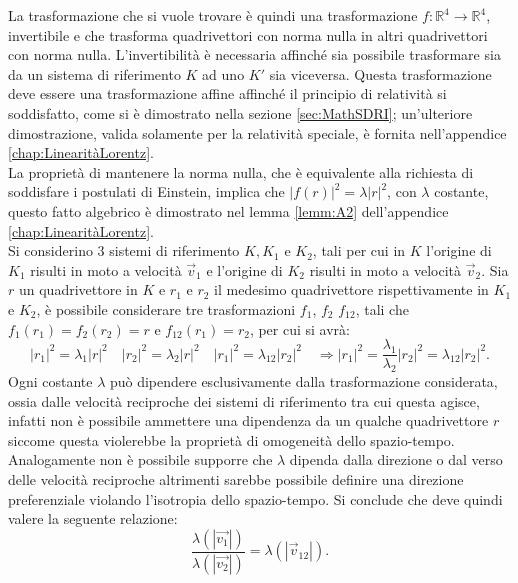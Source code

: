 La trasformazione che si vuole trovare è quindi una trasformazione $f:\mathbb{R}^4\rightarrow\mathbb{R}^4$, invertibile e che trasforma quadrivettori con norma nulla in altri quadrivettori con norma nulla. L'invertibilità è necessaria affinché sia possibile trasformare sia da un sistema di riferimento $K$ ad uno $K'$ sia viceversa. Questa trasformazione deve essere una trasformazione affine affinché il principio di relatività si soddisfatto, come si è dimostrato nella sezione \ref{sec:MathSDRI}; un'ulteriore dimostrazione, valida solamente per la relatività speciale, è fornita nell'appendice \ref{chap:LinearitàLorentz}.\\
La proprietà di mantenere la norma nulla, che è equivalente alla richiesta di soddisfare i postulati di Einstein, implica che  $|f(r)|^2=\lambda |r|^2$, con $\lambda$ costante, questo fatto algebrico è dimostrato nel lemma \ref{lemm:A2} dell'appendice \ref{chap:LinearitàLorentz}.\\ Si considerino $3$ sistemi di riferimento $ K, K_1$ e $K_2$, tali per cui in $K$ l'origine di $K_1$ risulti in moto a velocità $\vec{v}_1$ e l'origine di $K_2$ risulti in moto a velocità $\vec{v}_2$. Sia $r$ un quadrivettore in $K$ e $r_1$ e $r_2$ il medesimo quadrivettore rispettivamente in $K_1$ e $K_2$, è possibile considerare tre trasformazioni $f_1$, $f_2$ $f_{12}$, tali che $f_1(r_1)=f_2(r_2)=r$ e $f_{12}(r_1)=r_2$, per cui si avrà:
\begin{equation*}
    |r_1|^2=\lambda_1 |r|^2 \quad |r_2|^2=\lambda_2 |r|^2 \quad |r_1|^2=\lambda_{12} |r_2|^2 \quad  \Rightarrow |r_1|^2=\frac{\lambda_1}{\lambda_2}|r_2|^2=\lambda_{12}|r_2|^2.
\end{equation*}
Ogni costante $\lambda$ può dipendere esclusivamente dalla trasformazione considerata, ossia dalle velocità reciproche dei sistemi di riferimento tra cui questa agisce, infatti non è possibile ammettere una dipendenza da un qualche quadrivettore $r$ siccome questa violerebbe la proprietà di omogeneità dello spazio-tempo. Analogamente non è possibile supporre che $\lambda$ dipenda dalla direzione o dal verso delle velocità reciproche altrimenti sarebbe possibile definire una direzione preferenziale violando l'isotropia dello spazio-tempo. Si conclude che deve quindi valere la seguente relazione:
\begin{equation}
    \frac{\lambda(|\vec{v_1}|)}{\lambda(|\vec{v_2}|)}=\lambda(|\vec{v}_{12}|).
    \label{fraclambda}
\end{equation} 
